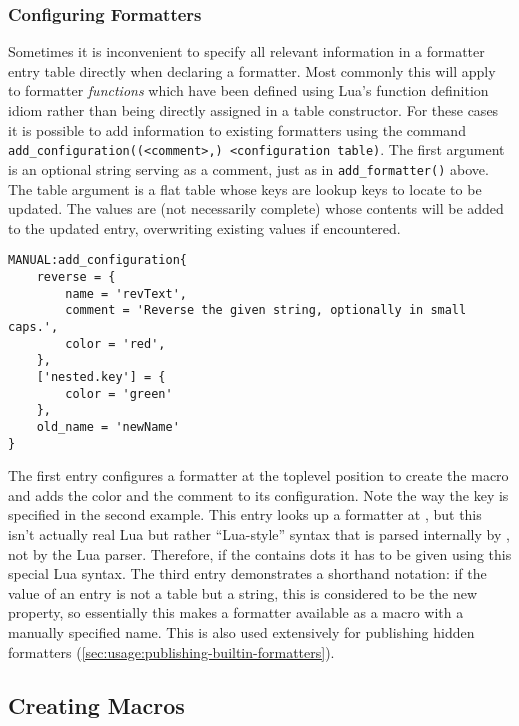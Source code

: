 \documentclass[12pt]{scrartcl}
\begin{document}
\subsubsection{Configuring Formatters}
\label{sec:usage:configuring-formatters}

Sometimes it is inconvenient to specify all relevant information in a formatter
entry table directly when declaring a formatter.  Most commonly this will
apply to formatter \emph{functions} which have been defined using Lua's function
definition idiom rather than being directly assigned in a table constructor.
For these cases it is possible to add information to existing formatters using
the command \texttt{add_configuration((<comment>,) <configuration
table)}. The first argument is an optional string serving as a comment, just as in \texttt{add_formatter()} above.  The table argument is a flat table whose keys are lookup keys to locate  to be updated. The values are (not necessarily complete)  whose contents will be added to the updated entry, overwriting existing values if encountered.

\begin{verbatim}
MANUAL:add_configuration{
	reverse = {
	    name = 'revText',
	    comment = 'Reverse the given string, optionally in small caps.',
	    color = 'red',
	},
	['nested.key'] = {
		color = 'green'
	},
	old_name = 'newName'
}
\end{verbatim}

\noindent The first entry configures a formatter at the toplevel position
 to create the macro  and adds the color and the
comment to its configuration.  Note the way the key is specified in the second
example.  This entry looks up a formatter at , but this isn't
actually real Lua but rather “Lua-style” syntax that is parsed internally by
\luaformatters, not by the Lua parser.  Therefore, if the  contains
dots it has to be given using this special Lua syntax.  The third entry
demonstrates a shorthand notation: if the value of an entry is not a table but a
string, this is considered to be the new  property, so essentially
this makes a formatter available as a macro with a manually specified name.
This is also used extensively for publishing hidden formatters
(\vref{sec:usage:publishing-builtin-formatters}).


\subsection{Creating Macros}
\label{sec:creating-macros}
\end{document}
